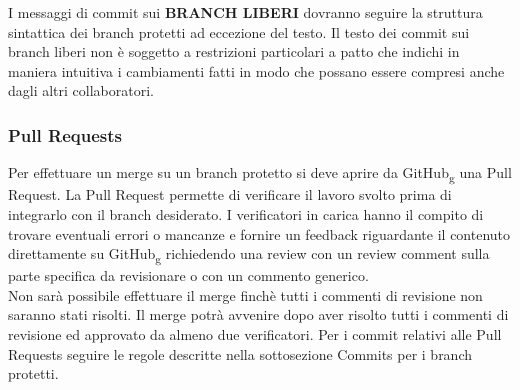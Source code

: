 I messaggi di commit sui \textbf{\uppercase{branch liberi}} dovranno seguire la struttura sintattica dei branch protetti ad eccezione del testo.
Il testo dei commit sui branch liberi non è soggetto a restrizioni particolari a patto che indichi in maniera intuitiva i cambiamenti fatti
in modo che possano essere compresi anche dagli altri collaboratori.



\subsubsection{Pull Requests}
Per effettuare un merge su un branch protetto si deve aprire da GitHub\textsubscript{g} una Pull Request.
La Pull Request permette di verificare il lavoro svolto prima di integrarlo con il branch desiderato.
I verificatori in carica hanno il compito di trovare eventuali errori o mancanze e fornire un feedback riguardante il contenuto direttamente su GitHub\textsubscript{g} richiedendo
una review con un review comment sulla parte specifica da revisionare o con un commento generico.\\
Non sarà possibile effettuare il merge finchè tutti i commenti di revisione non saranno stati risolti.
Il merge potrà avvenire dopo aver risolto tutti i commenti di revisione ed approvato da almeno due verificatori.
Per i commit relativi alle Pull Requests seguire le regole descritte nella sottosezione Commits per i branch protetti.




